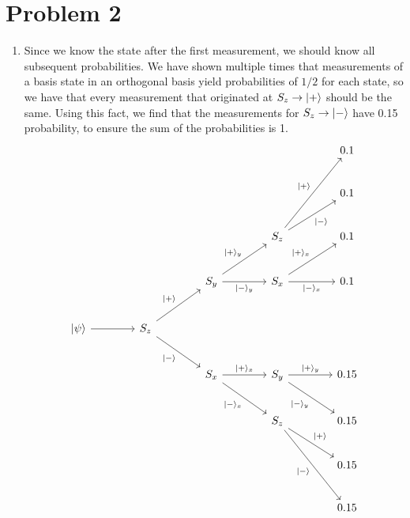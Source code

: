 \documentclass[11pt, letterpaper]{article}
\begin{document}
\section*{Problem 2}
\begin{enumerate}
	\item Since we know the state after the first measurement, we should know all subsequent probabilities. We have shown multiple times that measurements of a basis state in an orthogonal basis yield probabilities of $1/2$ for each state, so we have that every measurement that originated at $S_z \to \lvert+\rangle $ should be the same. Using this fact, we find that the measurements for $S_z \to \lvert-\rangle $ have 0.15 probability, to ensure the sum of the probabilities is 1.
		\[\begin{tikzcd}[row sep = 2.5em, column sep = 4em]
			&&&&0.1\\
			&&&&0.1\\
			&&&S_z\arrow[ru, "\ket{-}"']\arrow[ruu, "\ket{+}"]&0.1\\
			&&S_y\arrow[ru, "\ket{+}_y"]\arrow[r, "\ket{-}_y"']&S_x\arrow[ru, "\ket{+}_x"]\arrow[r, "\ket{-}_x"']&0.1\\
			\ket{\psi }\arrow[r]&S_z\arrow[ru, "\ket{+}"]\arrow[dr, "\ket{-} "'] \\
					    &&S_x\arrow[dr, "\ket{-}_x"']\arrow[r, "\ket{+}_x"]&S_y\arrow[dr, "\ket{-}_y"']\arrow[r, "\ket{+}_y"]&0.15\\
				   &&&S_z\arrow[ddr, "\ket{-}"']\arrow[dr, "\ket{+} "]&0.15\\
				   &&&&0.15\\
				   &&&&0.15
		\end{tikzcd}\]
		

\end{enumerate}
\end{document}
